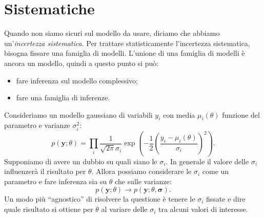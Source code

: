 
\section{Sistematiche}

Quando non siamo sicuri sul modello da usare,
diciamo che abbiamo un'\emph{incertezza sistematica}.
Per trattare statisticamente l'incertezza sistematica,
bisogna fissare una famiglia di modelli.
L'unione di una famiglia di modelli è ancora un modello,
quindi a questo punto si può:
\begin{itemize}
	\item fare inferenza sul modello complessivo;
	\item fare una famiglia di inferenze.
\end{itemize}

\begin{example}
	Consideriamo un modello gaussiano di variabili $y_i$
	con media $\mu_i(\theta)$ funzione del parametro e varianze $\sigma_i^2$:
	\begin{equation*}
		p(\mathbf y;\theta)
		= \prod_i \frac1{\sqrt{2\pi}\sigma_i}
		\exp\left(-\frac12\left(\frac{y_i-\mu_i(\theta)}{\sigma_i}\right)^2\right).
	\end{equation*}
	Supponiamo di avere un dubbio su quali siano le $\sigma_i$.
	In generale il valore delle $\sigma_i$ influenzerà il risultato per $\theta$.
	Allora possiamo considerare le $\sigma_i$ come un parametro
	e fare inferenza sia su $\theta$ che sulle varianze:
	\begin{equation*}
		p(\mathbf y;\theta) \rightarrow p(\mathbf y;\theta,\boldsymbol\sigma).
	\end{equation*}
	Un modo più ``agnostico'' di risolvere la questione è tenere le $\sigma_i$ fissate
	e dire quale risultato si ottiene per $\theta$ al variare delle $\sigma_i$
	tra alcuni valori di interesse.
\end{example}


